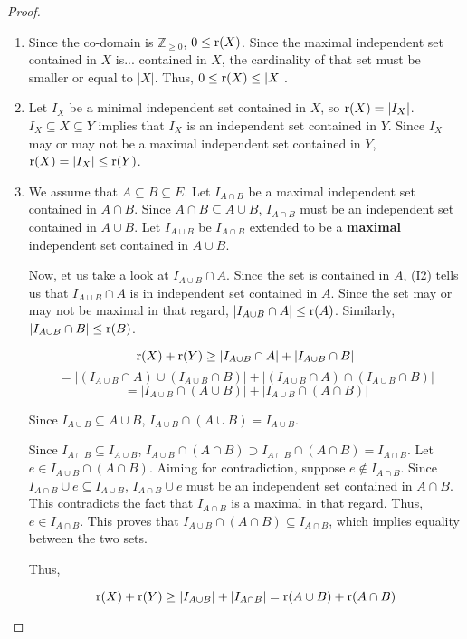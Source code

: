 \begin{proof}
    \,
    \begin{enumerate}
        \item Since the co-domain is $\mathbb{Z}_{\geq0}$, $0\leq\operatorname{r}(X)$. Since the maximal independent set contained in $X$ is... contained in $X$, the cardinality of that set must be smaller or equal to $|X|$. Thus, $0\leq\operatorname{r}(X)\leq|X|$.
        \item Let $I_X$ be a minimal independent set contained in $X$, so $\operatorname{r}(X)=|I_X|$. $I_X\subseteq X\subseteq Y$ implies that $I_X$ is an independent set contained in $Y$. Since $I_X$ may or may not be a maximal independent set contained in $Y$, $\operatorname{r}(X)=|I_X|\leq\operatorname{r}(Y)$. 
        \item We assume that $A\subseteq B\subseteq E$. Let $I_{A\cap B}$ be a maximal independent set contained in $A\cap B$. Since $A\cap B\subseteq A\cup B$, $I_{A\cap B}$ must be an independent set contained in $A\cup B$. Let $I_{A\cup B}$ be $I_{A\cap B}$ extended to be a \textbf{maximal} independent set contained in $A\cup B$. 
        
        Now, et us take a look at $I_{A\cup B}\cap A$. Since the set is contained in $A$, (I2) tells us that $I_{A\cup B}\cap A$ is in independent set contained in $A$. Since the set may or may not be maximal in that regard, $|I_{A\cup B}\cap A|\leq \operatorname{r}(A)$. Similarly, $|I_{A\cup B}\cap B|\leq \operatorname{r}(B) $.
        
        $$ \operatorname{r}(X)+\operatorname{r}(Y) \geq |I_{A\cup B}\cap A|+|I_{A\cup B}\cap B| $$
        $$ = |(I_{A\cup B}\cap A)\cup(I_{A\cup B}\cap B)|+|(I_{A\cup B}\cap A)\cap(I_{A\cup B}\cap B)| $$
        $$ = |I_{A\cup B}\cap (A\cup B)|+|I_{A\cup B}\cap (A\cap B)| $$

        Since $I_{A\cup B}\subseteq A\cup B$, $I_{A\cup B}\cap(A\cup B) = I_{A\cup B}$.

        Since $I_{A\cap B}\subseteq I_{A\cup B}$, $I_{A\cup B}\cap (A\cap B) \supset I_{A\cap B}\cap (A\cap B) = I_{A\cap B} $. Let $e\in I_{A\cup B}\cap (A\cap B)$. Aiming for contradiction, suppose $e\notin I_{A\cap B}$. Since $I_{A\cap B}\cup e \subseteq I_{A\cup B} $, $I_{A\cap B}\cup e$ must be an independent set contained in $A\cap B$. This contradicts the fact that $I_{A\cap B}$ is a maximal in that regard. Thus, $e\in I_{A\cap B}$. This proves that $I_{A\cup B}\cap(A\cap B)\subseteq I_{A\cap B} $, which implies equality between the two sets.

        Thus,

        $$ \operatorname{r}(X)+\operatorname{r}(Y) \geq |I_{A\cup B}|+|I_{A\cap B}| = \operatorname{r}(A\cup B)+\operatorname{r}(A\cap B) $$
    \end{enumerate}
\end{proof}
